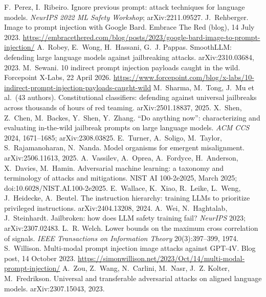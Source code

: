  F.~Perez, I.~Ribeiro. Ignore previous prompt: attack techniques for language models. \emph{NeurIPS 2022 ML Safety Workshop}; arXiv:2211.09527.
 J.~Rehberger. Image to prompt injection with Google Bard. Embrace The Red (blog), 14 July 2023. \url{https://embracethered.com/blog/posts/2023/google-bard-image-to-prompt-injection/}
 A.~Robey, E.~Wong, H.~Hassani, G.~J. Pappas. SmoothLLM: defending large language models against jailbreaking attacks. arXiv:2310.03684, 2023.
 M.~Sewani. 10 indirect prompt injection payloads caught in the wild. Forcepoint X-Labs, 22 April 2026. \url{https://www.forcepoint.com/blog/x-labs/10-indirect-prompt-injection-payloads-caught-wild}
 M.~Sharma, M.~Tong, J.~Mu et al.\ (43 authors). Constitutional classifiers: defending against universal jailbreaks across thousands of hours of red teaming. arXiv:2501.18837, 2025.
 X.~Shen, Z.~Chen, M.~Backes, Y.~Shen, Y.~Zhang. ``Do anything now'': characterizing and evaluating in-the-wild jailbreak prompts on large language models. \emph{ACM CCS} 2024, 1671--1685; arXiv:2308.03825.
 E.~Turner, A.~Soligo, M.~Taylor, S.~Rajamanoharan, N.~Nanda. Model organisms for emergent misalignment. arXiv:2506.11613, 2025.
 A.~Vassilev, A.~Oprea, A.~Fordyce, H.~Anderson, X.~Davies, M.~Hamin. Adversarial machine learning: a taxonomy and terminology of attacks and mitigations. NIST AI 100-2e2025, March 2025; doi:10.6028/NIST.AI.100-2e2025.
 E.~Wallace, K.~Xiao, R.~Leike, L.~Weng, J.~Heidecke, A.~Beutel. The instruction hierarchy: training LLMs to prioritize privileged instructions. arXiv:2404.13208, 2024.
 A.~Wei, N.~Haghtalab, J.~Steinhardt. Jailbroken: how does LLM safety training fail? \emph{NeurIPS} 2023; arXiv:2307.02483.
 L.~R. Welch. Lower bounds on the maximum cross correlation of signals. \emph{IEEE Transactions on Information Theory} 20(3):397--399, 1974.
 S.~Willison. Multi-modal prompt injection image attacks against GPT-4V. Blog post, 14 October 2023. \url{https://simonwillison.net/2023/Oct/14/multi-modal-prompt-injection/}
 A.~Zou, Z.~Wang, N.~Carlini, M.~Nasr, J.~Z. Kolter, M.~Fredrikson. Universal and transferable adversarial attacks on aligned language models. arXiv:2307.15043, 2023.
